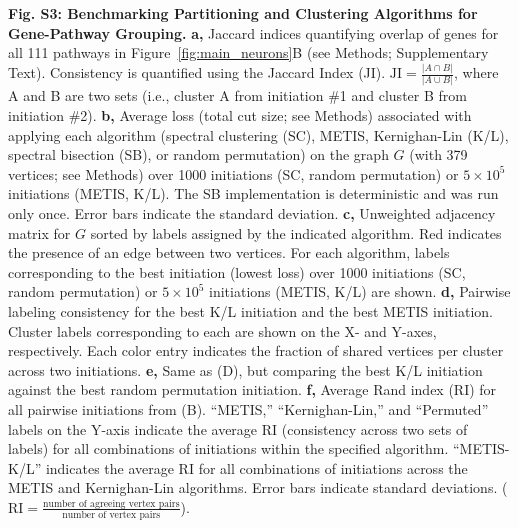 \textbf{Fig. S3: Benchmarking Partitioning and Clustering Algorithms for Gene-Pathway Grouping.}
\textbf{a,} Jaccard indices quantifying overlap of genes for all 111 pathways in Figure~\ref{fig:main_neurons}B (see Methods; Supplementary Text). Consistency is quantified using the Jaccard Index (JI). $\text{JI} = \frac{|A \cap B|}{|A \cup B|}$, where A and B are two sets (i.e., cluster A from initiation \#1 and cluster B from initiation \#2).
\textbf{b,} Average loss (total cut size; see Methods) associated with applying each algorithm (spectral clustering (SC), METIS, Kernighan-Lin (K/L), spectral bisection (SB), or random permutation) on the graph $G$ (with 379 vertices; see Methods) over 1000 initiations (SC, random permutation) or $5 \times 10^5$ initiations (METIS, K/L). The SB implementation is deterministic and was run only once. Error bars indicate the standard deviation. 
\textbf{c,} Unweighted adjacency matrix for $G$ sorted by labels assigned by the indicated algorithm. Red indicates the presence of an edge between two vertices. For each algorithm, labels corresponding to the best initiation (lowest loss) over 1000 initiations (SC, random permutation) or $5 \times 10^5$ initiations (METIS, K/L) are shown. 
\textbf{d,} Pairwise labeling consistency for the best K/L initiation and the best METIS initiation. Cluster labels corresponding to each are shown on the X- and Y-axes, respectively. Each color entry indicates the fraction of shared vertices per cluster across two initiations. 
\textbf{e,} Same as (D), but comparing the best K/L initiation against the best random permutation initiation. 
\textbf{f,} Average Rand index (RI) for all pairwise initiations from (B). “METIS,” “Kernighan-Lin,” and “Permuted” labels on the Y-axis indicate the average RI (consistency across two sets of labels) for all combinations of initiations within the specified algorithm. “METIS-K/L” indicates the average RI for all combinations of initiations across the METIS and Kernighan-Lin algorithms. Error bars indicate standard deviations. ($\text{RI} = \frac{\text{number of agreeing vertex pairs}}{\text{number of vertex pairs}}$).
